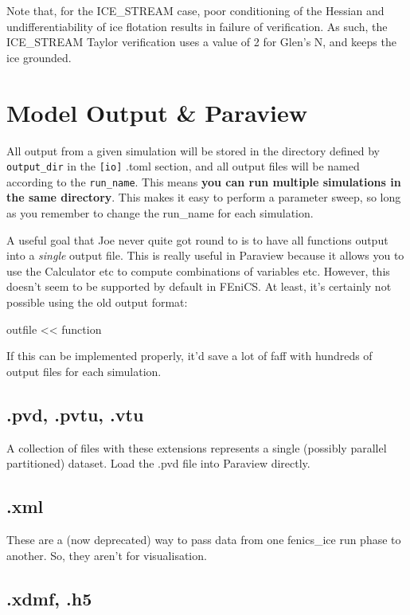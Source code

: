 \documentclass[11pt, reqno, nocenter]{article}
\begin{document}
Note that, for the ICE\_STREAM case, poor conditioning of the Hessian and undifferentiability of ice flotation results in failure of verification. As such, the ICE\_STREAM Taylor verification uses a value of 2 for Glen's N, and keeps the ice grounded.

\section{Model Output \& Paraview}

All output from a given simulation will be stored in the directory defined by \texttt{output\_dir} in the \texttt{[io]} .toml section, and all output files will be named according to the \texttt{run\_name}. This means \textbf{you can run multiple simulations in the same directory}. This makes it easy to perform a parameter sweep, so long as you remember to change the run\_name for each simulation.

A useful goal that Joe never quite got round to is to have all functions output into a \emph{single} output file. This is really useful in Paraview because it allows you to use the Calculator etc to compute combinations of variables etc. However, this doesn't seem to be supported by default in FEniCS. At least, it's certainly not possible using the old output format:

\begin{spverbatim}
outfile << function
\end{spverbatim}

If this can be implemented properly, it'd save a lot of faff with hundreds of output files for each simulation.

\subsection{.pvd, .pvtu, .vtu}

A collection of files with these extensions represents a single (possibly parallel partitioned) dataset. Load the .pvd file into Paraview directly.

\subsection{.xml}

These are a (now deprecated) way to pass data from one fenics\_ice run phase to another. So, they aren't for visualisation.

\subsection{.xdmf, .h5}
\end{document}
